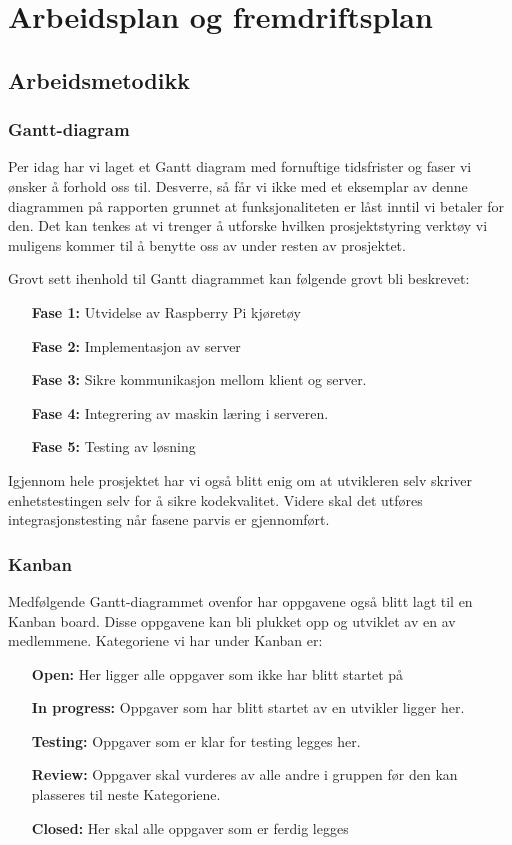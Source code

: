 \chapter{Arbeidsplan og fremdriftsplan}
\section{Arbeidsmetodikk}
\subsection{Gantt-diagram}
Per idag har vi laget et Gantt diagram med fornuftige tidsfrister og faser vi ønsker å forhold oss til. Desverre, så får vi ikke med et eksemplar av denne diagrammen på rapporten grunnet at funksjonaliteten er låst inntil vi betaler for den. Det kan tenkes at vi trenger å utforske hvilken prosjektstyring verktøy vi muligens kommer til å benytte oss av under resten av prosjektet.

Grovt sett ihenhold til Gantt diagrammet kan følgende grovt bli beskrevet:
\begin{enumerate}
    \item[\textbf{Fase 1:}] Utvidelse av Raspberry Pi kjøretøy
    \item[\textbf{Fase 2:}] Implementasjon av server
    \item[\textbf{Fase 3:}] Sikre kommunikasjon mellom klient og server.
    \item[\textbf{Fase 4:}] Integrering av maskin læring i serveren.
    \item[\textbf{Fase 5:}] Testing av løsning
\end{enumerate}
Igjennom hele prosjektet har vi også blitt enig om at utvikleren selv skriver enhetstestingen selv for å sikre kodekvalitet. Videre skal det utføres integrasjonstesting når fasene parvis er gjennomført.

\subsection{Kanban}
Medfølgende Gantt-diagrammet ovenfor har oppgavene også blitt lagt til en Kanban board. Disse oppgavene kan bli plukket opp og utviklet av en av medlemmene. Kategoriene vi har under Kanban er:
\begin{itemize}
    \item[\textbf{Open:}] Her ligger alle oppgaver som ikke har blitt startet på
    \item[\textbf{In progress:}] Oppgaver som har blitt startet av en utvikler ligger her.
    \item[\textbf{Testing:}] Oppgaver som er klar for testing legges her.
    \item[\textbf{Review:}] Oppgaver skal vurderes av alle andre i gruppen før den kan plasseres til neste Kategoriene.
    \item[\textbf{Closed:}] Her skal alle oppgaver som er ferdig legges   
\end{itemize}

